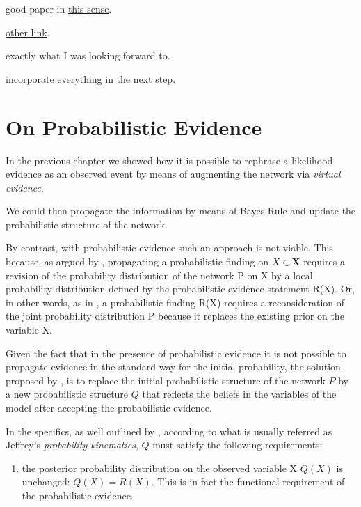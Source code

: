 \documentclass[11pt]{article}
\begin{document}
\begin{article}
\begin{enumerate}
good paper in \href{https://arxiv.org/pdf/1608.01734.pdf}{this sense}.

\href{https://scholar.google.com/scholar?q=Method\%20for\%20Computation\%20of\%20the\%20Fisher\%20Information\%20Matrix\%20in\%20the\%20Expectation\%2DMaximization\%20Algorithm\&btnG=Search\&as\_sdt=800000000001\&as\_sdtp=on}{other link}.

exactly what I was looking forward to.

incorporate everything in the next step.
\end{enumerate}


\section{On Probabilistic Evidence}
\label{sec:org8509245}

In the previous chapter we showed how it is possible to rephrase a
likelihood evidence as an observed event by means of augmenting the
network via \emph{virtual evidence}.

We could then propagate the information by means of Bayes Rule
and update the probabilistic structure of the network.

By contrast, with probabilistic evidence such an approach is not
viable. This because, as argued by \cite{PENG_2010}, propagating a
probabilistic finding on \(X \in \textbf{X}\) requires a revision of
the probability distribution of the network P on X by a local
probability distribution defined by the probabilistic evidence
statement R(X). Or, in other words, as in \cite{Mrad_2015}, a
probabilistic finding R(X) requires a reconsideration of the joint
probability distribution P because it replaces the existing prior on
the variable X.

Given the fact that in the presence of probabilistic evidence it is
not possible to propagate evidence in the standard way for the
initial probability, the solution proposed by \cite{jeffrey1990logic},
is to replace the initial probabilistic structure of the network \(P\)
by a new probabilistic structure \(Q\) that reflects the beliefs in
the variables of the model after accepting the probabilistic
evidence.

In the specifics, as well outlined by \cite{Mrad_2015}, according to
what is usually referred as Jeffrey's \emph{probability kinematics}, \(Q\)
must satisfy the following requirements:

\begin{enumerate}
\item the posterior probability distribution on the observed variable X
\(Q(X)\) is unchanged: \(Q(X) = R(X)\). This is in fact the
functional requirement of the probabilistic evidence.


\end{enumerate}
\end{article}
\end{document}
